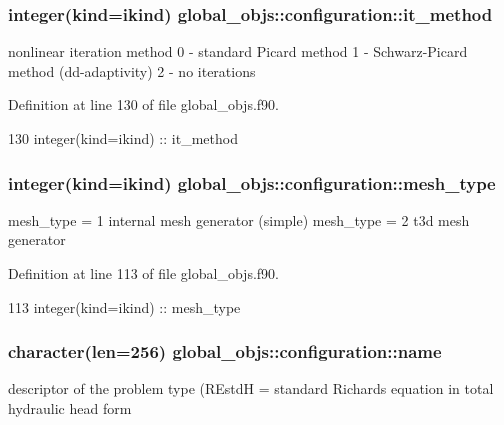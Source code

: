 \subsubsection[{it\+\_\+method}]{\setlength{\rightskip}{0pt plus 5cm}integer(kind=ikind) global\+\_\+objs\+::configuration\+::it\+\_\+method}\label{structglobal__objs_1_1configuration_aec5b67f7d4a0e994cbe7ad3c7a88f696}


nonlinear iteration method 0 -\/ standard Picard method 1 -\/ Schwarz-\/\+Picard method (dd-\/adaptivity) 2 -\/ no iterations 



Definition at line 130 of file global\+\_\+objs.\+f90.


\begin{DoxyCode}
130     \textcolor{keywordtype}{integer(kind=ikind)} :: it\_method
\end{DoxyCode}
\subsubsection[{mesh\+\_\+type}]{\setlength{\rightskip}{0pt plus 5cm}integer(kind=ikind) global\+\_\+objs\+::configuration\+::mesh\+\_\+type}\label{structglobal__objs_1_1configuration_ad27cfb09bcd10d68000dc3962b6d6210}


mesh\+\_\+type = 1 internal mesh generator (simple) mesh\+\_\+type = 2 t3d mesh generator 



Definition at line 113 of file global\+\_\+objs.\+f90.


\begin{DoxyCode}
113     \textcolor{keywordtype}{integer(kind=ikind)} :: mesh\_type
\end{DoxyCode}
\subsubsection[{name}]{\setlength{\rightskip}{0pt plus 5cm}character(len=256) global\+\_\+objs\+::configuration\+::name}\label{structglobal__objs_1_1configuration_aa84278e83c6d0abf94a848665c6711b1}


descriptor of the problem type (R\+EstdH = standard Richards equation in total hydraulic head form 



